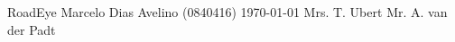 \documentclass[11pt,a4paper,twoside]{report}%
\newif\ifpublic \newif\iftwocol %
\begin{document}
\titelblad                   %
  {RoadEye} %
  {Marcelo Dias Avelino (0840416)} %
  {\TI}                      %
  {\today}                   %
  {Mrs. T. Ubert}           %
  {Mr. A. van der Padt}                         %
\ifpublic
  {\footnotesize{}}
\else
  \tableofcontents         %
\fi
\ifpublic
  \iflanguage{dutch}{\def\bibname{\normalsize{Bronnen}}}
                    {\def\bibname{\normalsize{References}}}
  {\footnotesize{}}   %
\else
  \appendix
\fi
\end{document}
